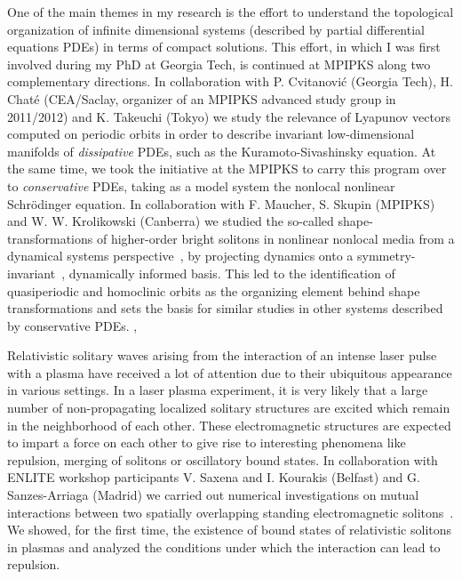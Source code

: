 \documentclass[11pt,a4paper,final]{moderncv}
\begin{document}
One of the main themes in my research is the effort to understand the topological organization of 
infinite dimensional systems (described by partial differential equations PDEs) in terms of compact solutions.
This effort, in which I was first involved during my PhD at Georgia Tech, is continued at MPIPKS along two complementary
directions. In collaboration with P. Cvitanovi\'c (Georgia Tech), H. Chat\'e (CEA/Saclay, organizer of
an MPIPKS advanced study group in 2011/2012) and K. Takeuchi (Tokyo) we study the relevance of
Lyapunov vectors computed on periodic orbits in order to describe invariant low-dimensional manifolds
of \emph{dissipative} PDEs, such as the Kuramoto-Sivashinsky equation. At the same time, we took the initiative
at the MPIPKS to carry this program over to \emph{conservative} PDEs, taking as a model system the nonlocal nonlinear
Schr\"odinger equation. In collaboration with F. Maucher, S. Skupin (MPIPKS) and W. W. Krolikowski (Canberra)
we studied the so-called shape-transformations of higher-order bright solitons in nonlinear nonlocal media
from a dynamical systems perspective~\cite{maucher2013}, by projecting dynamics onto a symmetry-invariant~\cite{SiCvi10, atlas12},
dynamically informed basis. This led to the identification of quasiperiodic and homoclinic orbits 
as the organizing element behind shape transformations and sets the basis for similar studies in other systems
described by conservative PDEs.
\sep

Relativistic solitary waves arising from the interaction of an intense laser pulse with a plasma have received
a lot of attention due to their ubiquitous appearance in various settings.
In a laser plasma experiment, it is very likely that a large number of non-propagating 
localized solitary structures are excited which remain in the neighborhood of each other. 
These electromagnetic structures are expected to impart a force on each other
to give rise to interesting phenomena like repulsion, merging of
solitons or oscillatory bound states. 
In collaboration with ENLITE workshop participants V. Saxena and I. Kourakis (Belfast) and G. Sanzes-Arriaga (Madrid)
we carried out numerical investigations on mutual interactions between two spatially overlapping standing 
electromagnetic solitons~\cite{saxena2013}.
We showed, for the first time, the existence of bound states of relativistic solitons in plasmas and analyzed the conditions
under which the interaction can lead to repulsion. 
\end{document}
